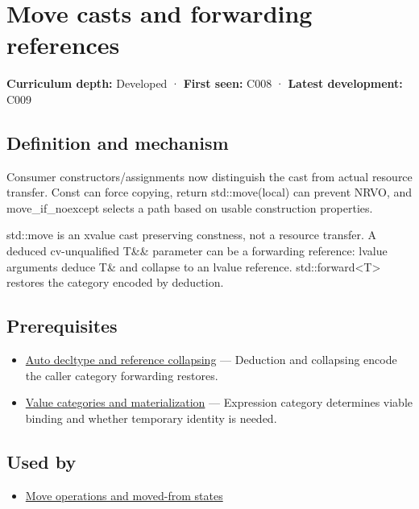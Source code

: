 \hypertarget{appendix-0104b704fb11}{}
\section{Move casts and forwarding references}\label{appendix-0104b704fb11-move-casts-and-forwarding-references}

\textbf{Curriculum depth:} Developed · \textbf{First seen:} C008 · \textbf{Latest development:} C009

\subsection{Definition and mechanism}\label{appendix-0104b704fb11-definition-and-mechanism}

Consumer constructors/assignments now distinguish the cast from actual resource transfer. Const can force copying, return std::move(local) can prevent NRVO, and move\_if\_noexcept selects a path based on usable construction properties.

std::move is an xvalue cast preserving constness, not a resource transfer. A deduced cv-unqualified T\&\& parameter can be a forwarding reference: lvalue arguments deduce T\& and collapse to an lvalue reference. std::forward\textless T\textgreater{} restores the category encoded by deduction.

\subsection{Prerequisites}\label{appendix-0104b704fb11-prerequisites}

\begin{itemize}
\tightlist
\item
  \hyperref[appendix-5d4252a42886]{Auto decltype and reference collapsing} --- Deduction and collapsing encode the caller category forwarding restores.
\item
  \hyperref[appendix-1121b30eaeb0]{Value categories and materialization} --- Expression category determines viable binding and whether temporary identity is needed.
\end{itemize}

\subsection{Used by}\label{appendix-0104b704fb11-used-by}

\begin{itemize}
\tightlist
\item
  \hyperref[appendix-5636651017c2]{Move operations and moved-from states}
\end{itemize}

